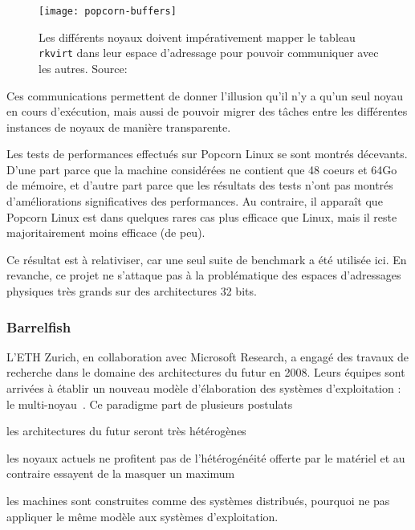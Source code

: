       \begin{figure}[h]
        \centering
        \texttt{[image: popcorn-buffers]}
        \caption{Les différents noyaux doivent impérativement mapper le tableau
          \texttt{rkvirt} dans leur espace d'adressage pour pouvoir communiquer
          avec les autres. Source:~\citeauthor{barbalacepopcorn}}
        \label{fig:popcorn-buf}
      \end{figure}

      Ces communications permettent de donner l’illusion qu’il n’y a qu’un seul
      noyau en cours d’exécution, mais aussi de pouvoir migrer des tâches entre
      les différentes instances de noyaux de manière transparente.

      Les tests de performances effectués sur Popcorn Linux se sont montrés
      décevants. D'une part parce que la machine considérées ne contient que
      48
      coeurs et 64Go de mémoire, et d'autre part parce que les résultats des
      tests n'ont pas montrés d'améliorations significatives des
      performances. Au contraire, il apparaît que Popcorn Linux est dans
      quelques rares cas plus efficace que Linux, mais il reste majoritairement
      moins efficace (de peu).

      Ce résultat est à relativiser, car une seul suite de benchmark a été
      utilisée ici. En revanche, ce projet ne s'attaque pas à la problématique
      des espaces d'adressages physiques très grands sur des architectures 32
      bits.


    \subsubsection{Barrelfish}
      
      L’ETH Zurich, en collaboration avec Microsoft Research, a engagé des
      travaux de recherche dans le domaine des architectures du futur en
      2008. Leurs équipes sont arrivées à établir un nouveau modèle
      d’élaboration des systèmes d’exploitation : le
      multi-noyau~\citep{schupbach2008embracing}. Ce paradigme part de plusieurs
      postulats\benumline \item les architectures du futur seront très
      hétérogènes \item les noyaux actuels ne profitent pas de l’hétérogénéité
      offerte par le matériel et au contraire essayent de la masquer un maximum
      \item les machines sont construites comme des systèmes distribués,
        pourquoi ne pas appliquer le même modèle aux systèmes
        d’exploitation\eenumline.

